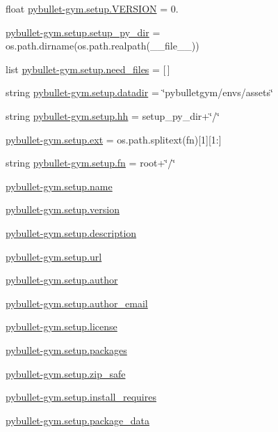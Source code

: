 \begin{DoxyCompactItemize}
\item 
float \hyperlink{namespacepybullet-gym_1_1setup_aca07b4f29306bcccdabcd823403668ed}{pybullet-\/gym.\+setup.\+V\+E\+R\+S\+I\+ON} = 0.
\item 
\hyperlink{namespacepybullet-gym_1_1setup_aea2e24ad8e50ce857991531b431dcf87}{pybullet-\/gym.\+setup.\+setup\+\_\+py\+\_\+dir} = os.\+path.\+dirname(os.\+path.\+realpath(\+\_\+\+\_\+file\+\_\+\+\_\+))
\item 
list \hyperlink{namespacepybullet-gym_1_1setup_afb33ea2198b21a77b6db3e523a4ac72a}{pybullet-\/gym.\+setup.\+need\+\_\+files} = \mbox{[}$\,$\mbox{]}
\item 
string \hyperlink{namespacepybullet-gym_1_1setup_a3654e7ede0195fc072e944f57af3aa29}{pybullet-\/gym.\+setup.\+datadir} = \char`\"{}pybulletgym/envs/assets\char`\"{}
\item 
string \hyperlink{namespacepybullet-gym_1_1setup_a0a9bee282bbc69aa0e3ecebffd3653a5}{pybullet-\/gym.\+setup.\+hh} = setup\+\_\+py\+\_\+dir+\char`\"{}/\char`\"{}
\item 
\hyperlink{namespacepybullet-gym_1_1setup_aeae0f87f04affe37723e80359fa580f0}{pybullet-\/gym.\+setup.\+ext} = os.\+path.\+splitext(fn)\mbox{[}1\mbox{]}\mbox{[}1\+:\mbox{]}
\item 
string \hyperlink{namespacepybullet-gym_1_1setup_a0c50456b56113b23543800298eff04c1}{pybullet-\/gym.\+setup.\+fn} = root+\char`\"{}/\char`\"{}
\item 
\hyperlink{namespacepybullet-gym_1_1setup_aaf5f8e71b4e68a4c46a0d8ca700d8b5b}{pybullet-\/gym.\+setup.\+name}
\item 
\hyperlink{namespacepybullet-gym_1_1setup_a8d27b9d24f16174ff7014bd5d60a39d2}{pybullet-\/gym.\+setup.\+version}
\item 
\hyperlink{namespacepybullet-gym_1_1setup_abb162ef9737fa16dc3806471cbbaa07e}{pybullet-\/gym.\+setup.\+description}
\item 
\hyperlink{namespacepybullet-gym_1_1setup_a6e778f26d12c9149dedfefb994c5703d}{pybullet-\/gym.\+setup.\+url}
\item 
\hyperlink{namespacepybullet-gym_1_1setup_a875d60d2ace5c2d3e7f79814bb376daf}{pybullet-\/gym.\+setup.\+author}
\item 
\hyperlink{namespacepybullet-gym_1_1setup_ad43e19dc1dcda037646c182c24c0e7cb}{pybullet-\/gym.\+setup.\+author\+\_\+email}
\item 
\hyperlink{namespacepybullet-gym_1_1setup_ad41c57561d336cfa9807108f8ce237b2}{pybullet-\/gym.\+setup.\+license}
\item 
\hyperlink{namespacepybullet-gym_1_1setup_ac64fbb4020665cf11ce8a81e800d26ca}{pybullet-\/gym.\+setup.\+packages}
\item 
\hyperlink{namespacepybullet-gym_1_1setup_a3bf7f27f84154ed1471705270b9ec082}{pybullet-\/gym.\+setup.\+zip\+\_\+safe}
\item 
\hyperlink{namespacepybullet-gym_1_1setup_a62086f7863468f737ebf22128e392593}{pybullet-\/gym.\+setup.\+install\+\_\+requires}
\item 
\hyperlink{namespacepybullet-gym_1_1setup_a187400dfdb32a010447de8771201bd8b}{pybullet-\/gym.\+setup.\+package\+\_\+data}
\end{DoxyCompactItemize}
